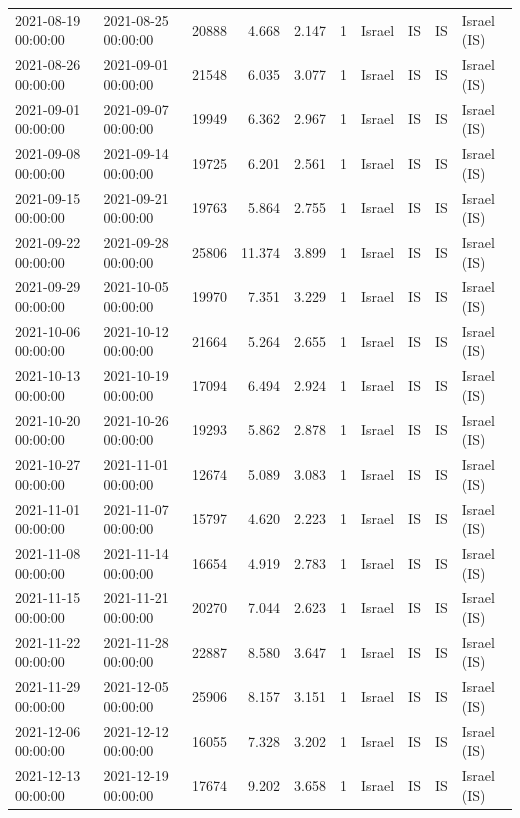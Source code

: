 \begin{tabular}{llrrrlllll}
2021-08-19 00:00:00 & 2021-08-25 00:00:00 & 20888 & 4.668 & 2.147 & 1 & Israel & IS & IS & Israel (IS) \\
2021-08-26 00:00:00 & 2021-09-01 00:00:00 & 21548 & 6.035 & 3.077 & 1 & Israel & IS & IS & Israel (IS) \\
2021-09-01 00:00:00 & 2021-09-07 00:00:00 & 19949 & 6.362 & 2.967 & 1 & Israel & IS & IS & Israel (IS) \\
2021-09-08 00:00:00 & 2021-09-14 00:00:00 & 19725 & 6.201 & 2.561 & 1 & Israel & IS & IS & Israel (IS) \\
2021-09-15 00:00:00 & 2021-09-21 00:00:00 & 19763 & 5.864 & 2.755 & 1 & Israel & IS & IS & Israel (IS) \\
2021-09-22 00:00:00 & 2021-09-28 00:00:00 & 25806 & 11.374 & 3.899 & 1 & Israel & IS & IS & Israel (IS) \\
2021-09-29 00:00:00 & 2021-10-05 00:00:00 & 19970 & 7.351 & 3.229 & 1 & Israel & IS & IS & Israel (IS) \\
2021-10-06 00:00:00 & 2021-10-12 00:00:00 & 21664 & 5.264 & 2.655 & 1 & Israel & IS & IS & Israel (IS) \\
2021-10-13 00:00:00 & 2021-10-19 00:00:00 & 17094 & 6.494 & 2.924 & 1 & Israel & IS & IS & Israel (IS) \\
2021-10-20 00:00:00 & 2021-10-26 00:00:00 & 19293 & 5.862 & 2.878 & 1 & Israel & IS & IS & Israel (IS) \\
2021-10-27 00:00:00 & 2021-11-01 00:00:00 & 12674 & 5.089 & 3.083 & 1 & Israel & IS & IS & Israel (IS) \\
2021-11-01 00:00:00 & 2021-11-07 00:00:00 & 15797 & 4.620 & 2.223 & 1 & Israel & IS & IS & Israel (IS) \\
2021-11-08 00:00:00 & 2021-11-14 00:00:00 & 16654 & 4.919 & 2.783 & 1 & Israel & IS & IS & Israel (IS) \\
2021-11-15 00:00:00 & 2021-11-21 00:00:00 & 20270 & 7.044 & 2.623 & 1 & Israel & IS & IS & Israel (IS) \\
2021-11-22 00:00:00 & 2021-11-28 00:00:00 & 22887 & 8.580 & 3.647 & 1 & Israel & IS & IS & Israel (IS) \\
2021-11-29 00:00:00 & 2021-12-05 00:00:00 & 25906 & 8.157 & 3.151 & 1 & Israel & IS & IS & Israel (IS) \\
2021-12-06 00:00:00 & 2021-12-12 00:00:00 & 16055 & 7.328 & 3.202 & 1 & Israel & IS & IS & Israel (IS) \\
2021-12-13 00:00:00 & 2021-12-19 00:00:00 & 17674 & 9.202 & 3.658 & 1 & Israel & IS & IS & Israel (IS) \\

\end{tabular}
